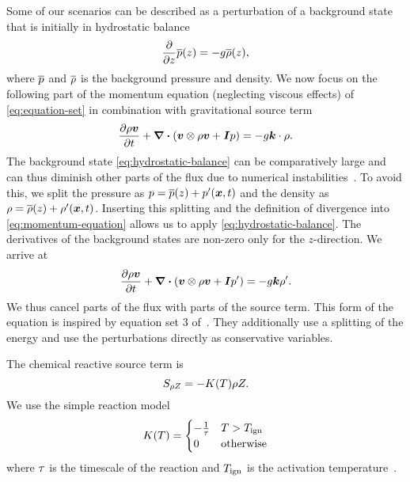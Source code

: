 \newcommand{\backgroundPressure}{\overline{\pressure}}
\newcommand{\backgroundRho}{\overline{\Qrho}}
Some of our scenarios can be described as a perturbation of a background state that is initially in hydrostatic balance
\begin{equation}
  \label{eq:hydrostatic-balance}
  \pdv{}{z} \backgroundPressure{\left (z \right )} = -g \backgroundRho(z),
\end{equation}
where $\backgroundPressure$ and $\backgroundRho$ is the background pressure and density.
We now focus on the following part of the momentum equation (neglecting viscous effects) of \cref{eq:equation-set} in combination with gravitational source term~
\begin{equation}
  \label{eq:momentum-equation}
  \pdv{\Qj}{t}+ \divergence{ \left(
    \Qv \otimes \Qj + \bm{I} \pressure
    \right)
  }
  =
  -g \bm{k} \cdot \Qrho.
\end{equation}
The background state \cref{eq:hydrostatic-balance} can be comparatively large and can thus diminish other parts of the flux due to numerical instabilities~\cite{muller2010adaptive}.
To avoid this, we split the pressure as $\pressure = \backgroundPressure(z) + \pressure' (\bm{x}, t)$ and the density as $\Qrho = \backgroundRho(z) + \Qrho'(\bm{x}, t)$.
Inserting this splitting and the definition of divergence into \cref{eq:momentum-equation} allows us to apply \cref{eq:hydrostatic-balance}.
The derivatives of the background states are non-zero only for the $z$-direction.
We arrive at 
\begin{equation}
  \label{eq:momentum-equation-split}
  \pdv{\Qj}{t}+ \divergence{ \left(
    \Qv \otimes \Qj + \bm{I} \pressure'
    \right)
  }
  =
  -g \bm{k} \Qrho'.
\end{equation}
We thus cancel parts of the flux with parts of the source term.
This form of the equation is inspired by equation set 3 of~\cite{giraldo2008study}.
They additionally use a splitting of the energy and use the perturbations directly as conservative variables.

The chemical reactive source term is
\begin{equation}\label{eq:source-reaction}
  \source[\QZ] = - K(T) \QZ.
\end{equation}
We use the simple reaction model
\begin{equation}\label{eq:reaction-model}
  K(T) = 
\begin{cases}
  - \frac{1}{\tau} & T > T_{\text{ign}}\\
  0 & \text{otherwise}
\end{cases}  
\end{equation}
where $\tau$ is the timescale of the reaction and $T_{\text{ign}}$ is the activation temperature~\cite{hidalgo2011ader,helzel2000modified}.

